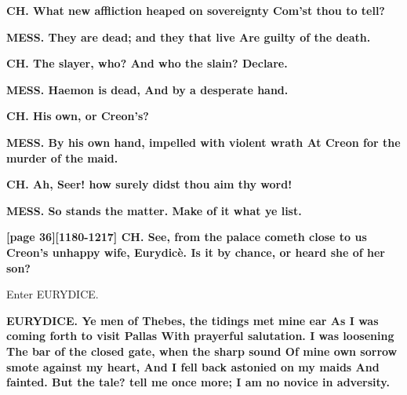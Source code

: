 \documentclass[11pt,letter]{book}
\begin{document}
\par \textbf{CH. What new affliction heaped on sovereignty Com’st thou to tell?}
\par 

\par \textbf{MESS. They are dead; and they that live Are guilty of the death.}
\par 

\par \textbf{CH. The slayer, who? And who the slain? Declare.}
\par 

\par \textbf{MESS. Haemon is dead, And by a desperate hand.}
\par 

\par \textbf{CH. His own, or Creon’s?}
\par 

\par \textbf{MESS. By his own hand, impelled with violent wrath At Creon for the murder of the maid.}
\par 

\par \textbf{CH. Ah, Seer! how surely didst thou aim thy word!}
\par 

\par \textbf{MESS. So stands the matter. Make of it what ye list.}
\par 

\par \textbf{[page 36][1180-1217] CH. See, from the palace cometh close to us Creon’s unhappy wife, Eurydicè. Is it by chance, or heard she of her son?}
\par 

\par  Enter EURYDICE.

\par \textbf{EURYDICE. Ye men of Thebes, the tidings met mine ear As I was coming forth to visit Pallas With prayerful salutation. I was loosening The bar of the closed gate, when the sharp sound Of mine own sorrow smote against my heart, And I fell back astonied on my maids And fainted. But the tale? tell me once more; I am no novice in adversity.}
\par 
\end{document}
